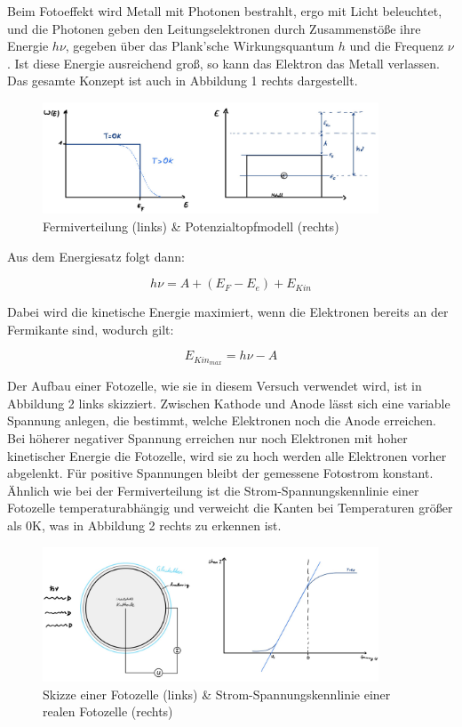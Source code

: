 \documentclass{article}
\begin{document}
Beim Fotoeffekt wird Metall mit Photonen bestrahlt, ergo mit Licht beleuchtet, und die Photonen geben den Leitungselektronen durch Zusammenstöße ihre Energie $h \nu$, gegeben über das Plank'sche Wirkungsquantum $h$ und die Frequenz $\nu$. Ist diese Energie ausreichend groß, so kann das Elektron das Metall verlassen. Das gesamte Konzept ist auch in Abbildung 1 rechts dargestellt.

\begin{figure} [!ht]
    \centering
    \includegraphics[width=10cm]{graphics/abb1.jpg}
    \caption{Fermiverteilung (links) \& Potenzialtopfmodell (rechts)}
\end{figure}

Aus dem Energiesatz folgt dann:

\begin{equation}
    h \nu = A + (E_F - E_e) + E_{Kin}
\end{equation}

Dabei wird die kinetische Energie maximiert, wenn die Elektronen bereits an der Fermikante sind, wodurch gilt:

\begin{equation}
    E_{Kin_{max}} = h \nu - A
\end{equation}

Der Aufbau einer Fotozelle, wie sie in diesem Versuch verwendet wird, ist in Abbildung 2 links skizziert. Zwischen Kathode und Anode lässt sich eine variable Spannung anlegen, die bestimmt, welche Elektronen noch die Anode erreichen. Bei höherer negativer Spannung erreichen nur noch Elektronen mit hoher kinetischer Energie die Fotozelle, wird sie zu hoch werden alle Elektronen vorher abgelenkt. Für positive Spannungen bleibt der gemessene Fotostrom konstant. Ähnlich wie bei der Fermiverteilung ist die Strom-Spannungskennlinie einer Fotozelle temperaturabhängig und verweicht die Kanten bei Temperaturen größer als 0K, was in Abbildung 2 rechts zu erkennen ist. 

\begin{figure} [!ht]
    \centering
    \includegraphics[width=10cm]{graphics/abb2.jpg}
    \caption{Skizze einer Fotozelle (links) \& Strom-Spannungskennlinie einer realen Fotozelle (rechts)}
\end{figure}
\end{document}
